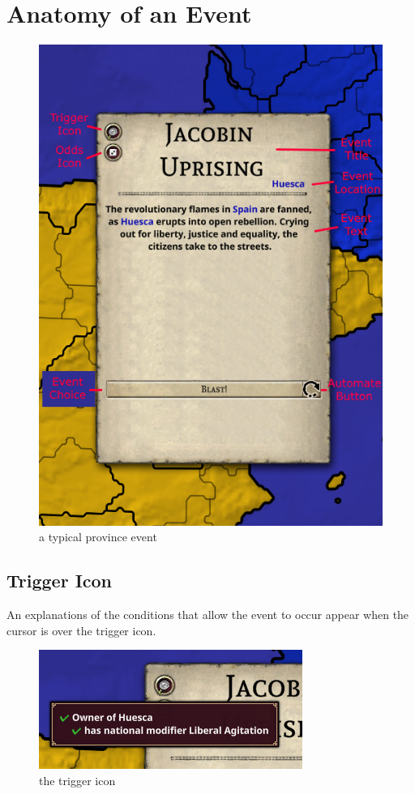 \section{Anatomy of an Event}
\begin{figure}[htb]
	\begin{center}
	\includegraphics[scale=0.75]{province_event.png}
	\end{center}
	\caption{a typical province event}
\end{figure}
\afterpage{\clearpage}

\subsection{Trigger Icon}
An explanations of the conditions that allow the event to occur appear when the cursor is over the trigger icon.

\begin{figure}[htb]
\begin{center}
	\includegraphics{province_e_trigger.png}
\end{center}
\caption{the trigger icon}
\end{figure}

